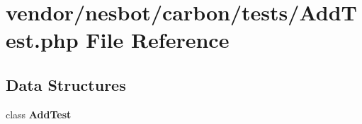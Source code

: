 \section{vendor/nesbot/carbon/tests/\+Add\+Test.php File Reference}
\label{_add_test_8php}
\subsection*{Data Structures}
\begin{DoxyCompactItemize}
\item 
class {\bf Add\+Test}
\end{DoxyCompactItemize}

